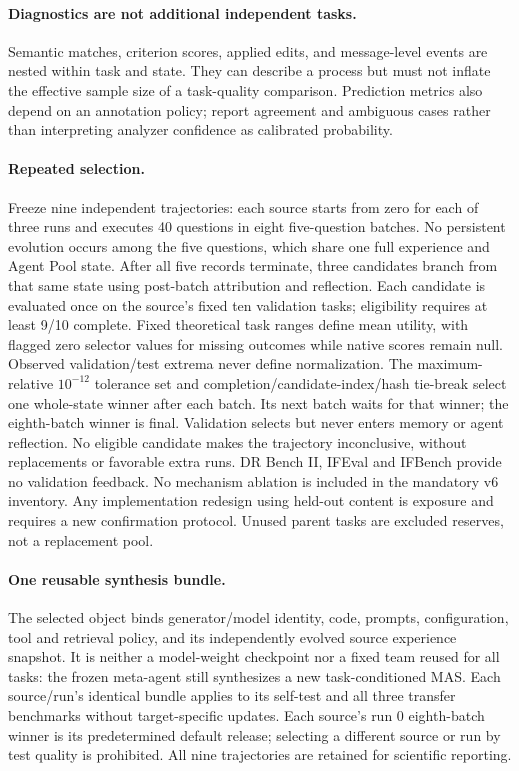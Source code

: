 \paragraph{Diagnostics are not additional independent tasks.}
Semantic matches, criterion scores, applied edits, and message-level events are nested within task and state. They can describe a process but must not inflate the effective sample size of a task-quality comparison. Prediction metrics also depend on an annotation policy; report agreement and ambiguous cases rather than interpreting analyzer confidence as calibrated probability.

\paragraph{Repeated selection.}
Freeze nine independent trajectories: each source starts from zero for each of three runs and executes 40 questions in eight five-question batches. No persistent evolution occurs among the five questions, which share one full experience and Agent Pool state. After all five records terminate, three candidates branch from that same state using post-batch attribution and reflection. Each candidate is evaluated once on the source's fixed ten validation tasks; eligibility requires at least 9/10 complete. Fixed theoretical task ranges define mean utility, with flagged zero selector values for missing outcomes while native scores remain null. Observed validation/test extrema never define normalization. The maximum-relative $10^{-12}$ tolerance set and completion/candidate-index/hash tie-break select one whole-state winner after each batch. Its next batch waits for that winner; the eighth-batch winner is final. Validation selects but never enters memory or agent reflection. No eligible candidate makes the trajectory inconclusive, without replacements or favorable extra runs. DR Bench II, IFEval and IFBench provide no validation feedback. No mechanism ablation is included in the mandatory v6 inventory. Any implementation redesign using held-out content is exposure and requires a new confirmation protocol. Unused parent tasks are excluded reserves, not a replacement pool.

\paragraph{One reusable synthesis bundle.}
The selected object binds generator/model identity, code, prompts, configuration, tool and retrieval policy, and its independently evolved source experience snapshot. It is neither a model-weight checkpoint nor a fixed team reused for all tasks: the frozen meta-agent still synthesizes a new task-conditioned MAS. Each source/run's identical bundle applies to its self-test and all three transfer benchmarks without target-specific updates. Each source's run 0 eighth-batch winner is its predetermined default release; selecting a different source or run by test quality is prohibited. All nine trajectories are retained for scientific reporting.

